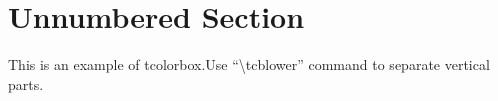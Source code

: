 \documentclass[a4paper,11pt]{article}%
\begin{document}
            \section*{Unnumbered Section}%
            \begin{tcolorbox}[standard jigsaw,colframe=white!25!blue!88!green,colback=black!5!white,arc=0mm,title={Box Title}]%
                This is an example of tcolorbox.\tcblower Use ``\textbackslash tcblower'' command to separate vertical parts.%
            \end{tcolorbox}%
        
\end{document}
